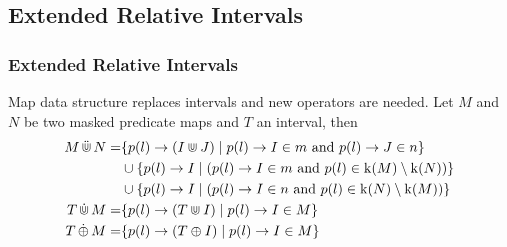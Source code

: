 \subsection{Extended Relative Intervals}
\begin{frame}
    \frametitle{Extended Relative Intervals}

    Map data structure replaces intervals and new operators are needed.
    \label{def:e-rel-int-ops}
    Let $M$ and $N$ be two masked predicate maps and $T$ an interval, then 
    \begin{align*}
        M \,\ddot{\Cup}\, N = 
            & \{ p(l) \rightarrow (I \Cup J) \mid 
                p(l) \rightarrow I \in m \text{ and } 
                p(l) \rightarrow J \in n \} \\
            & \cup \{p(l) \rightarrow I \mid  
                (p(l) \rightarrow I \in m \text{ and }
                p(l) \in \operatorname{k}(M) \setminus \operatorname{k}(N)) \} \\
            & \cup \{p(l) \rightarrow I \mid  
                (p(l) \rightarrow I \in n \text{ and }
                p(l) \in \operatorname{k}(N) \setminus \operatorname{k}(M))
                \} \\
        T \,\dot{\Cup}\, M = 
            & \{ p(l) \rightarrow (T \Cup I) \mid 
                p(l) \rightarrow I \in M \} \\
        T \,\dot{\oplus}\, M = 
            & \{ p(l) \rightarrow (T \oplus I) \mid 
                p(l) \rightarrow I \in M \} \\
    \end{align*}
    
\end{frame}


